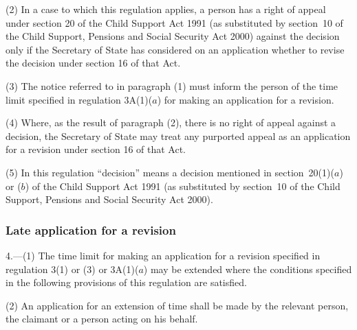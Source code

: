 \documentclass[12pt,a4paper]{article}
\begin{document}
(2) In a case to which this regulation applies, a person has a right of appeal under section 20 of the Child Support Act 1991 (as substituted by section~10 of the Child Support, Pensions and Social Security Act 2000) against the decision only if the Secretary of State has considered on an application whether to revise the decision under section 16 of that Act.

(3) The notice referred to in paragraph (1) must inform the person of the time limit specified in regulation 3A(1)($a$)  for making an application for a revision.

(4) Where, as the result of paragraph (2), there is no right of appeal against a decision, the Secretary of State may treat any purported appeal as an application for a revision under section 16 of that Act.

(5) In this regulation “decision” means a decision mentioned in section~20(1)($a$)  or ($b$)  of the Child Support Act 1991 (as substituted by section~10 of the Child Support, Pensions and Social Security Act 2000).


\subsubsection[4. Late application for a revision]{Late application for a revision}

4.—(1) The time limit for making an application for a revision specified in regulation 3(1) or (3) 
or 3A(1)($a$)  %
may be extended where the conditions specified in the following provisions of this regulation are satisfied.

(2) An application for an extension of time shall be made by 
the relevant person,  %
the claimant or a person acting on his behalf.
\end{document}
